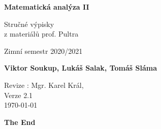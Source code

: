 \documentclass[11pt]{article}
\theoremstyle{nontheoremstyle}
\theoremstyle{nontheoremstylenodot}
\theoremstyle{theoremstyle}
\begin{document}
\begin{titlepage}
    \begin{center}
        \vspace*{1cm}
            
        \Huge
        \textbf{Matematická analýza II}
            
        \vspace{0.5cm}
        \LARGE
        Stručné výpisky
        \\

        z materiálů prof. Pultra

        \vspace{5mm}
        
        Zimní semestr 2020/2021
        
        \vspace{1.5cm}
            
        \textbf{Viktor Soukup, Lukáš Salak, Tomáš Sláma}
        
        \vfill
        \flushright
        \normalsize
        Revize : Mgr. Karel Král,\\
        Verze 2.1\\
        \today
        
    \end{center}
\end{titlepage}

\tableofcontents
\clearpage












\vfill
\begin{center}
\LARGE
\textbf{The End}
\end{center}
\end{document}

